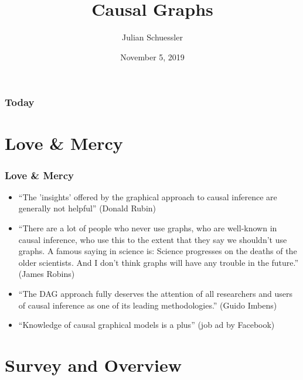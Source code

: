 \documentclass{beamer}
\begin{document}
	
\title{Causal Graphs }
\author{Julian Schuessler}
\date{November 5, 2019} 


\begin{frame}
	\titlepage
\end{frame}


\begin{frame}[t]
	\frametitle{Today}
	\tableofcontents
\end{frame}

\section{Love \& Mercy}

\begin{frame}[t]
\sectionpage
\end{frame}

\begin{frame}[t]
\frametitle{Love \& Mercy}
\begin{itemize}
	\item<2-> ``The 'insights' offered by the graphical approach to causal inference
	are generally not helpful'' (Donald Rubin)
	\item<3-> ``There are a lot of people who never use graphs, who are well-known in causal inference, who use this to the extent that they say we shouldn't use graphs. A famous saying in science is: Science progresses on the deaths of the older scientists. And I don't think graphs will have any trouble in the future.'' (James Robins)
	\item<4-> ``The DAG approach fully deserves the attention of all researchers and users of causal
	inference as one of its leading methodologies.'' (Guido Imbens)
	\item<5-> ``Knowledge of causal graphical models is a plus'' (job ad by Facebook)
\end{itemize}
\end{frame}

\section{Survey and Overview}

\begin{frame}[t]
\sectionpage
\end{frame}
\end{document}

